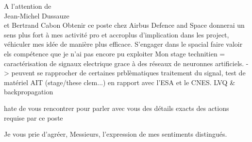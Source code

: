 \documentclass[12pt]{lettre}
\begin{document}
\begin{letter}{A l'attention de\\Jean-Michel Dussauze\\et Bertrand Cabon}
{%
Obtenir ce poste chez Airbus Defence and Space donnerai un sens plus fort
à mes activité pro et accroplus d'implication dans les project, véhiculer mes idée de manière plus efficace. S'engager dans le spacial
faire valoir els compétence que je n'ai pas encore pu exploiter
Mon stage technitien = caractérisation de signaux electrique grace à des réseaux
de neuronnes artificiels. -> peuvent se rapprocher de certaines prblèmatiques
traitement du signal, test de matériel AIT (stage/these clem...) en rapport avec
l'ESA et le CNES. LVQ \& backpropagation
}

hate de vous rencontrer pour parler avec vous des détails exacts des actions
requise par ce poste

\closing{Je vous prie d'agréer, Messieurs, l'expression de mes sentiments distingués.}
\end{letter}
\end{document}
